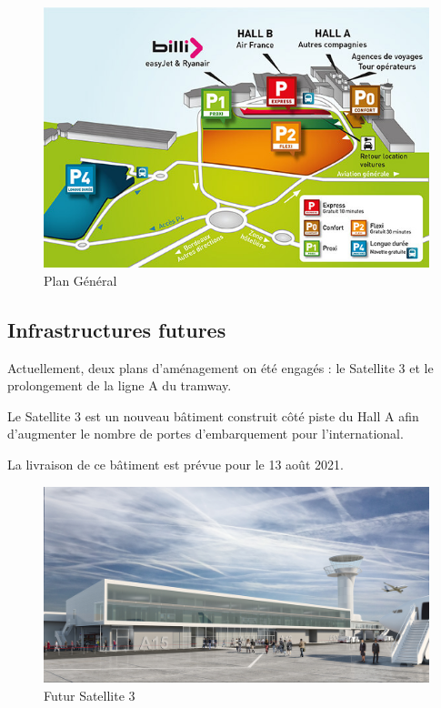\begin{figure}[hbt!]
    \centering
    \includegraphics[width=12cm]{Images/plan.jpg}
    \caption{Plan Général}
    \label{fig:plangeneral}
\end{figure}

\newpage

\subsection{Infrastructures futures}

Actuellement, deux plans d'aménagement on été engagés : le Satellite 3 et le prolongement de la ligne A du tramway.

Le Satellite 3 est un nouveau bâtiment construit côté piste du Hall A afin d'augmenter le nombre de portes d'embarquement pour l'international.

La livraison de ce bâtiment est prévue pour le 13 août 2021.\newline

\begin{figure}[hbt!]
    \centering
    \includegraphics[width=13cm]{Images/satellite3.jpg}
    \caption{Futur Satellite 3}
    \label{fig:sat3}
\end{figure}

